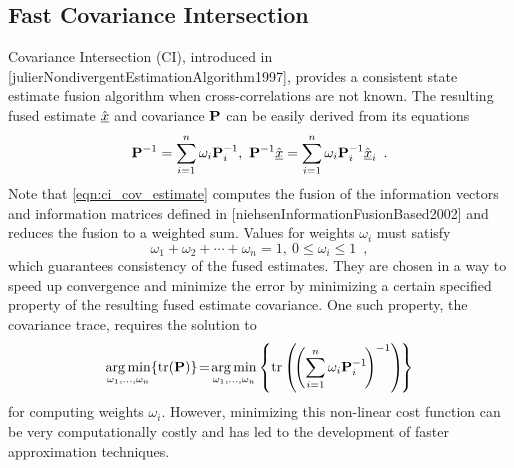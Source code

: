 \subsection{Fast Covariance Intersection}
Covariance Intersection (CI), introduced in [julierNondivergentEstimationAlgorithm1997], provides a consistent state estimate fusion algorithm when cross-correlations are not known. The resulting fused estimate $\hat{{\underline{x}}}$ and covariance ${{\mathbf{P}}}$ can be easily derived from its equations
\begin{equation}
   {\ensuremath{{\mathbf{P}}}}^{-1}=\sum_{i=1}^{n}\omega_i {{\mathbf{P}}}_i^{-1},\ {{\mathbf{P}}}^{-1} \hat{{\underline{x}}} =\sum_{i=1}^{n}\omega_i {{\mathbf{P}}}_i^{-1} \hat{{\underline{x}}}_i\enspace. \label{eqn:ci_cov_estimate}
\end{equation}
Note that \eqref{eqn:ci_cov_estimate} computes the fusion of the information vectors and information matrices defined in [niehsenInformationFusionBased2002] and reduces the fusion to a weighted sum. Values for weights $\omega_i$ must satisfy
\begin{equation}
   \omega_1 + \omega_2 + \cdots + \omega_n = 1,\ 0 \leq \omega_i \leq 1\enspace, \label{eqn:ci_omega_sum_bound}
\end{equation}
which guarantees consistency of the fused estimates. They are chosen in a way to speed up convergence and minimize the error by minimizing a certain specified property of the resulting fused estimate covariance. One such property, the covariance trace, requires the solution to
\begin{equation}
   \operatorname*{arg\,min}_{\omega_1,\dots,\omega_n} \{\operatorname{tr}({{\mathbf{P}}})\}\! =\! \operatorname*{arg\,min}_{\omega_1,\dots,\omega_n} \left\{\operatorname{tr}\left(\!\left(\sum_{i=1}^{n}\omega_i {{\mathbf{P}}}_i^{-1}\!\right)^{-1}\right)\!\right\} \label{eqn:ci_trace_min}
\end{equation}
for computing weights $\omega_i$. However, minimizing this non-linear cost function can be very computationally costly and has led to the development of faster approximation techniques.

